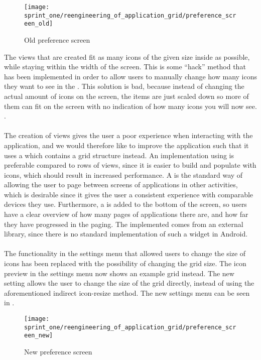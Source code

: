 \begin{figure}[!htbp]
    \centering
    \texttt{[image: sprint\_one/reengineering\_of\_application\_grid/preference\_screen\_old]}
    \caption{Old preference screen}
    \label{fig:preference_screen_old}
\end{figure}

The  views that are created fit as many icons of the given size inside as possible, while staying within the width of the screen. This is some ``hack'' method that has been implemented in order to allow users to manually change how many icons they want to see in the \launcher. This solution is bad, because instead of changing the actual amount of icons on the screen, the items are just scaled down so more of them can fit on the screen with no indication of how many icons you will now see. .
\\\\
The creation of  views gives the user a poor experience when interacting with the application, and we would therefore like to improve the \launcher application such that it uses a  which contains a grid structure instead. An implementation using  is preferable compared to rows of  views, since it is easier to build and populate with icons, which should result in increased performance. A  is the standard way of allowing the user to page between screens of applications in other \launcher activities, which is desirable since it gives the user a consistent experience with comparable devices they use. Furthermore, a  is added to the bottom of the screen, so users have a clear overview of how many pages of applications there are, and how far they have progressed in the paging. The implemented  comes from an external library\parencite{view_pager_indicator_avianey}, since there is no standard implementation of such a widget in Android. 
\\\\
The functionality in the settings menu that allowed users to change the size of icons has been replaced with the possibility of changing the \launcher grid size. The icon preview in the settings menu now shows an example grid instead. The new setting allows the user to change the size of the grid directly, instead of using the aforementioned indirect icon-resize method. The new settings menu can be seen in .


\begin{figure}[!htbp]
    \centering
    \texttt{[image: sprint\_one/reengineering\_of\_application\_grid/preference\_screen\_new]}
    \caption{New preference screen}
    \label{fig:preference_screen_new}
\end{figure}